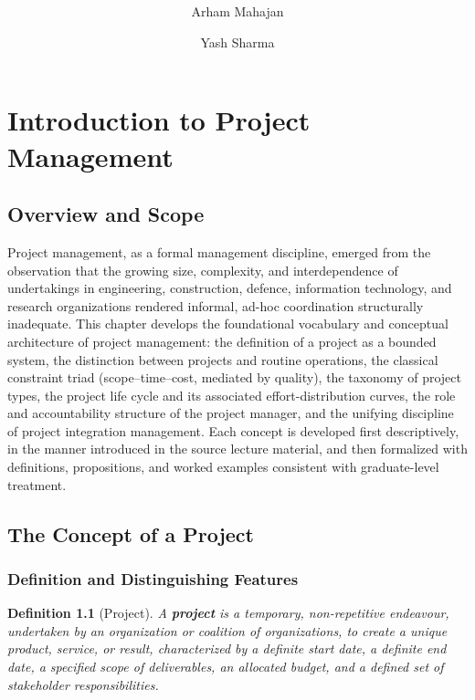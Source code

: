 \documentclass[12pt, a4paper]{report}
\title{\textbf{\Huge \UnitName}}
\author{Arham Mahajan}
\author{Yash Sharma}
\affil{Dept. of Mechanical Engineering, Netaji Subhas University of Technology (NSUT)}
\affil{\texttt{\{arham.mahajan.ug23, yash.sharma.ug23\}@nsut.ac.in}}
\theoremstyle{engnotes}
\newtheorem{defn}{Definition}[section]
\begin{document}
	\maketitle
	\tableofcontents
	\newpage

\chapter{Introduction to Project Management}
\label{ch:intro_project_management}

\section{Overview and Scope}
\label{sec:overview_scope}

Project management, as a formal management discipline, emerged from the observation that the growing size, complexity, and interdependence of undertakings in engineering, construction, defence, information technology, and research organizations rendered informal, ad-hoc coordination structurally inadequate. This chapter develops the foundational vocabulary and conceptual architecture of project management: the definition of a project as a bounded system, the distinction between projects and routine operations, the classical constraint triad (scope--time--cost, mediated by quality), the taxonomy of project types, the project life cycle and its associated effort-distribution curves, the role and accountability structure of the project manager, and the unifying discipline of project integration management. Each concept is developed first descriptively, in the manner introduced in the source lecture material, and then formalized with definitions, propositions, and worked examples consistent with graduate-level treatment.

\section{The Concept of a Project}
\label{sec:concept_of_project}

\subsection{Definition and Distinguishing Features}
\label{subsec:definition_distinguishing}

\begin{defn}[Project]\label{def:project}
    A \textbf{project} is a temporary, non-repetitive endeavour, undertaken by an organization or coalition of organizations, to create a unique product, service, or result, characterized by a definite start date, a definite end date, a specified scope of deliverables, an allocated budget, and a defined set of stakeholder responsibilities.
\end{defn}
\end{document}
